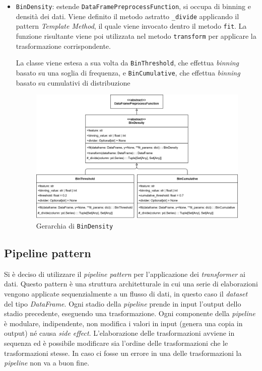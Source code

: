 \begin{itemize}
    \item \texttt{BinDensity}: estende \texttt{DataFramePreprocessFunction}, si occupa di binning e densità dei dati. Viene definito il metodo astratto \texttt{\_divide} applicando il pattern \textit{Template Method}, il quale viene invocato dentro il metodo \texttt{fit}. La funzione risultante viene poi utilizzata nel metodo \texttt{transform} per applicare la trasformazione corrispondente.
    
    La classe viene estesa a sua volta da \texttt{BinThreshold}, che effettua \textit{binning} basato su una soglia di frequenza, e \texttt{BinCumulative}, che effettua \textit{binning} basato su cumulativi di distribuzione
    \begin{figure}[H]
        \centering
        \includegraphics[scale=0.10]{figures/UML/preprocessing/bin_density.png}
        \caption{Gerarchia di \texttt{BinDensity}}
    \end{figure}
\end{itemize}

\subsection{Pipeline pattern}

Si è deciso di utilizzare il \textit{pipeline pattern} per l'applicazione dei \textit{transformer} ai dati. Questo pattern è una struttura architetturale in cui una serie di elaborazioni vengono applicate sequenzialmente a un flusso di dati, in questo caso il \textit{dataset} del tipo \textit{DataFrame}. Ogni stadio della \textit{pipeline} prende in input l'output dello stadio precedente, eseguendo una trasformazione. Ogni componente della \textit{pipeline} è modulare, indipendente, non modifica i valori in input (genera una copia in output) né causa \textit{side effect}. L'elaborazione delle trasformazioni avviene in sequenza ed è possibile modificare sia l'ordine delle trasformazioni che le trasformazioni stesse. In caso ci fosse un errore in una delle trasformazioni la \textit{pipeline} non va a buon fine.

